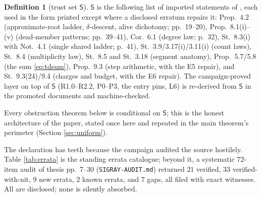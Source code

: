 \documentclass[11pt]{article}
\theoremstyle{definition}
\newtheorem{definition}[theorem]{Definition}
\theoremstyle{remark}
\begin{document}
\begin{definition}[trust set $\mathsf{S}$]\label{def:trust}
$\mathsf{S}$ is the following list of imported statements of \cite{Sigray}, each used in the form printed except where a disclosed erratum repairs it: Prop.~4.2 (approximate-root ladder, $\delta$-descent, alive dichotomy; pp.~19--20), Prop.~8.1(i)--(v) (dead-member patterns; pp.~39--41), Cor.~6.1 (degree law; p.~32), St.~8.3(i) with Not.~4.1 (single shared ladder; p.~41), St.~3.9/3.17(i)/3.11(i) (count laws), St.~8.4 (multiplicity law), St.~8.5 and St.~3.18 (segment anatomy), Prop.~5.7/5.8 (the sum \eqref{eq:tdsum}), Prop.~9.3 (step arithmetic, with the E5 repair), and St.~9.3(24)/9.4 (charges and budget, with the E6 repair). The campaign-proved layer on top of $\mathsf{S}$ (R1.0--R2.2, P0--P3, the entry pins, L6) is re-derived from $\mathsf{S}$ in the promoted documents and machine-checked.
\end{definition}

Every obstruction theorem below is conditional on $\mathsf{S}$; this is the honest architecture of the paper, stated once here and repeated in the main theorem's perimeter (Section \ref{sec:uniform}).

The declaration has teeth because the campaign audited the source hostilely. Table \ref{tab:errata} is the standing errata catalogue; beyond it, a systematic $72$-item audit of thesis pp.~7--30 (\texttt{SIGRAY-AUDIT.md}) returned $21$ verified, $33$ verified-with-nit, $9$ new errata, $2$ known errata, and $7$ gaps, all filed with exact witnesses. All are disclosed; none is silently absorbed.
\end{document}
